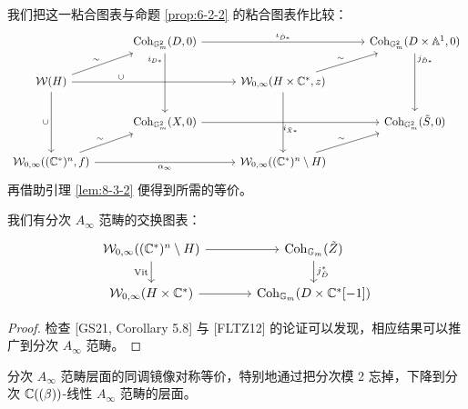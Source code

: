 我们把这一粘合图表与命题 \ref{prop:6-2-2} 的粘合图表作比较：
\[
\begin{tikzcd}[column sep=3.0em, row sep=1.7em]
& \operatorname{Coh}_{\mathbb G_m^2}(D,0) \arrow[rr, "\iota_{\tilde D*}"] \arrow[dd, "i_{D*}"', pos=0.1] & & \operatorname{Coh}_{\mathbb G_m^2}(D\times\mathbb A^1,0) \arrow[dd, "j_{\tilde D*}", pos=0.1] \\
\cW(H) \arrow[ur, "{\sim}"] \arrow[rr, "\cup", pos=0.3] \arrow[dd, "\cup"'] & & \cW_{0,\infty}(H\times\C^*,z) \arrow[ur, "{\sim}"] \arrow[dd] & \\
& \operatorname{Coh}_{\mathbb G_m^2}(X,0) \arrow[rr, "i_{\tilde X*}"'] & & \operatorname{Coh}_{\mathbb G_m^2}(\tilde S,0) \\
\cW_{0,\infty}((\C^*)^n,f) \arrow[ur, "{\sim}"] \arrow[rr, "\alpha_\infty"'] & & \cW_{0,\infty}((\C^*)^n\setminus H) \arrow[ur, "{\sim}"] &
\end{tikzcd}
\]
再借助引理 \ref{lem:8-3-2} 便得到所需的等价。

\begin{proposition}\label{prop:8-3-4}
我们有分次 $A_\infty$ 范畴的交换图表：
\[
\begin{tikzcd}[column sep=3.6em, row sep=1.7em]
\cW_{0,\infty}((\C^*)^n\setminus H) \arrow[r] \arrow[d, "\mathrm{Vit}"'] & \operatorname{Coh}_{\mathbb G_m}(\tilde Z) \arrow[d, "j_{\tilde D}^*"] \\
\cW_{0,\infty}(H\times\C^*) \arrow[r] & \operatorname{Coh}_{\mathbb G_m}(D\times\C^*[-1])
\end{tikzcd}
\]
\end{proposition}

\begin{proof}
检查 [GS21, Corollary 5.8] 与 [FLTZ12] 的论证可以发现，相应结果可以推广到分次 $A_\infty$ 范畴。
\end{proof}

分次 $A_\infty$ 范畴层面的同调镜像对称等价，特别地通过把分次模 2 忘掉，下降到分次 $\mathbb{C}((\beta))$-线性 $A_\infty$ 范畴的层面。


